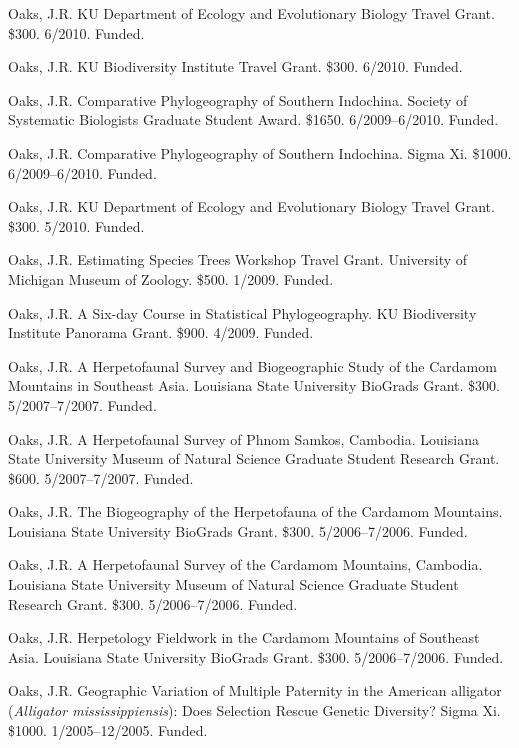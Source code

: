 \documentclass[10pt]{article}
\newcommand{\ignore}[1]{}
\newcommand{\myHangIndent}{\hangindent=5mm}
\begin{document}
\myHangIndent
Oaks, J.R.
KU Department of Ecology and Evolutionary Biology Travel Grant.
\$300.
6/2010.
Funded.

\myHangIndent
Oaks, J.R.
KU Biodiversity Institute Travel Grant.
\$300.
6/2010.
Funded.

\myHangIndent
Oaks, J.R.
Comparative Phylogeography of Southern Indochina.
Society of Systematic Biologists Graduate Student Award.
\$1650.
6/2009--6/2010.
Funded.

\myHangIndent
Oaks, J.R.
Comparative Phylogeography of Southern Indochina.
Sigma Xi.
\$1000.
6/2009--6/2010.
Funded.

\ignore{
\myHangIndent
Oaks, J.R.
Comparative Phylogeography of Southern Indochina.
The Society for the Study of Amphibians and Reptiles Dean E. Metter Award.
\$800.
6/2009--6/2010.
Not funded.
}
\myHangIndent
Oaks, J.R.
KU Department of Ecology and Evolutionary Biology Travel Grant.
\$300.
5/2010.
Funded.

\myHangIndent
Oaks, J.R.
Estimating Species Trees Workshop Travel Grant.
University of Michigan Museum of Zoology.
\$500.
1/2009.
Funded.

\myHangIndent
Oaks, J.R.
A Six-day Course in Statistical Phylogeography.
KU Biodiversity Institute Panorama Grant.
\$900.
4/2009.
Funded.

\myHangIndent
Oaks, J.R.
A Herpetofaunal Survey and Biogeographic Study of the Cardamom Mountains in
Southeast Asia.
Louisiana State University BioGrads Grant.
\$300.
5/2007--7/2007.
Funded.

\myHangIndent
Oaks, J.R.
A Herpetofaunal Survey of Phnom Samkos, Cambodia.
Louisiana State University Museum of Natural Science Graduate Student Research
Grant.
\$600.
5/2007--7/2007.
Funded.

\myHangIndent
Oaks, J.R.
The Biogeography of the Herpetofauna of the Cardamom Mountains.
Louisiana State University BioGrads Grant.
\$300.
5/2006--7/2006.
Funded.

\myHangIndent
Oaks, J.R.
A Herpetofaunal Survey of the Cardamom Mountains, Cambodia.
Louisiana State University Museum of Natural Science Graduate Student Research
Grant.
\$300.
5/2006--7/2006.
Funded.

\myHangIndent
Oaks, J.R.
Herpetology Fieldwork in the Cardamom Mountains of Southeast Asia.
Louisiana State University BioGrads Grant.
\$300.
5/2006--7/2006.
Funded.

\myHangIndent
Oaks, J.R.
Geographic Variation of Multiple Paternity in the American alligator
(\emph{Alligator mississippiensis}): Does Selection Rescue Genetic Diversity?
Sigma Xi.
\$1000.
1/2005--12/2005.
Funded.
\end{document}
